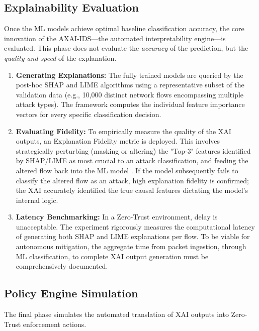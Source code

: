 \documentclass[conference]{IEEEtran}
\begin{document}
\subsection{Explainability Evaluation}
Once the ML models achieve optimal baseline classification accuracy, the core innovation of the AXAI-IDS—the automated interpretability engine—is evaluated. This phase does not evaluate the \textit{accuracy} of the prediction, but the \textit{quality and speed} of the explanation.

\begin{enumerate}
\item \textbf{Generating Explanations:} The fully trained models are queried by the post-hoc SHAP and LIME algorithms using a representative subset of the validation data (e.g., 10,000 distinct network flows encompassing multiple attack types). The framework computes the individual feature importance vectors for every specific classification decision.
\item \textbf{Evaluating Fidelity:} To empirically measure the quality of the XAI outputs, an Explanation Fidelity metric is deployed. This involves strategically perturbing (masking or altering) the "Top-3" features identified by SHAP/LIME as most crucial to an attack classification, and feeding the altered flow back into the ML model \cite{lundberg2017unified}. If the model subsequently fails to classify the altered flow as an attack, high explanation fidelity is confirmed; the XAI accurately identified the true causal features dictating the model’s internal logic.
\item \textbf{Latency Benchmarking:} In a Zero-Trust environment, delay is unacceptable. The experiment rigorously measures the computational latency of generating both SHAP and LIME explanations per flow. To be viable for autonomous mitigation, the aggregate time from packet ingestion, through ML classification, to complete XAI output generation must be comprehensively documented.
\end{enumerate}

\subsection{Policy Engine Simulation}
The final phase simulates the automated translation of XAI outputs into Zero-Trust enforcement actions. 
\end{document}
